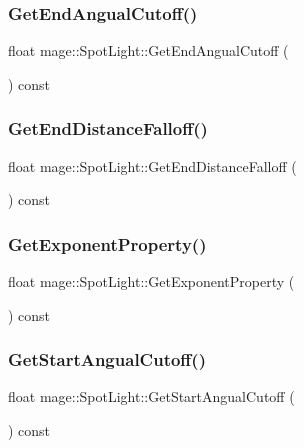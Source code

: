 \subsubsection{\texorpdfstring{Get\+End\+Angual\+Cutoff()}{GetEndAngualCutoff()}}
{\footnotesize\ttfamily float mage\+::\+Spot\+Light\+::\+Get\+End\+Angual\+Cutoff (\begin{DoxyParamCaption}{ }\end{DoxyParamCaption}) const}

\hypertarget{classmage_1_1_spot_light_a3e6767992846e17a9bebb66519c30f19}{}\label{classmage_1_1_spot_light_a3e6767992846e17a9bebb66519c30f19} 
\subsubsection{\texorpdfstring{Get\+End\+Distance\+Falloff()}{GetEndDistanceFalloff()}}
{\footnotesize\ttfamily float mage\+::\+Spot\+Light\+::\+Get\+End\+Distance\+Falloff (\begin{DoxyParamCaption}{ }\end{DoxyParamCaption}) const}

\hypertarget{classmage_1_1_spot_light_aaff34ca166a8a129f461579869803aaa}{}\label{classmage_1_1_spot_light_aaff34ca166a8a129f461579869803aaa} 
\subsubsection{\texorpdfstring{Get\+Exponent\+Property()}{GetExponentProperty()}}
{\footnotesize\ttfamily float mage\+::\+Spot\+Light\+::\+Get\+Exponent\+Property (\begin{DoxyParamCaption}{ }\end{DoxyParamCaption}) const}

\hypertarget{classmage_1_1_spot_light_abe143425da28281b7b72643bd2f1c5c2}{}\label{classmage_1_1_spot_light_abe143425da28281b7b72643bd2f1c5c2} 
\subsubsection{\texorpdfstring{Get\+Start\+Angual\+Cutoff()}{GetStartAngualCutoff()}}
{\footnotesize\ttfamily float mage\+::\+Spot\+Light\+::\+Get\+Start\+Angual\+Cutoff (\begin{DoxyParamCaption}{ }\end{DoxyParamCaption}) const}

